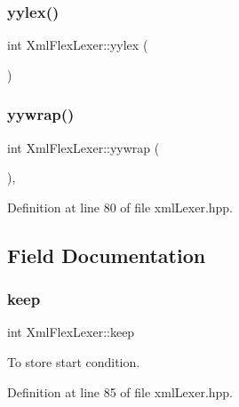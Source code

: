 \subsubsection{\texorpdfstring{yylex()}{yylex()}}
{\footnotesize\ttfamily int Xml\+Flex\+Lexer\+::yylex (\begin{DoxyParamCaption}{ }\end{DoxyParamCaption})\hspace{0.3cm}{\ttfamily [override]}}

\mbox{\label{structXmlFlexLexer_a2714688373ece5a7dbc563c784968c9d}} 
\subsubsection{\texorpdfstring{yywrap()}{yywrap()}}
{\footnotesize\ttfamily int Xml\+Flex\+Lexer\+::yywrap (\begin{DoxyParamCaption}{ }\end{DoxyParamCaption})\hspace{0.3cm}{\ttfamily [inline]}, {\ttfamily [override]}}



Definition at line 80 of file xml\+Lexer.\+hpp.



\subsection{Field Documentation}
\mbox{\label{structXmlFlexLexer_a7abf53697b8a3c3888ff5731fffbdd61}} 
\subsubsection{\texorpdfstring{keep}{keep}}
{\footnotesize\ttfamily int Xml\+Flex\+Lexer\+::keep}



To store start condition. 



Definition at line 85 of file xml\+Lexer.\+hpp.

\mbox{\label{structXmlFlexLexer_a9413bfda6343c736a991b705180d6900}} 
